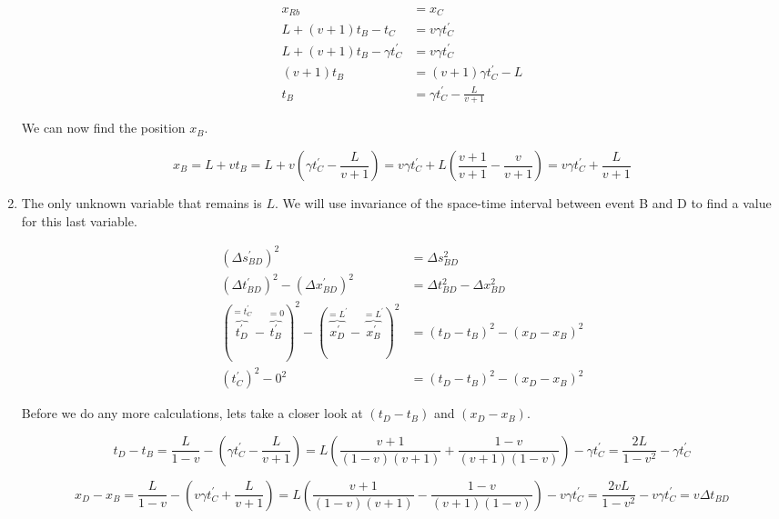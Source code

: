 \documentclass[a4paper,10pt,english]{article}
\begin{document}
\begin{enumerate}
\begin{align*}
x_{Rb}&=x_{C}\\
L+(v+1)t_{B}-t_{C}&=v\gamma t_{C}^{\prime}\\
L+(v+1)t_{B}-\gamma t_{C}^{\prime}&=v\gamma t_{C}^{\prime}\\
(v+1)t_{B}&=(v+1)\gamma t_{C}^{\prime}-L\\
t_{B}&=\gamma t_{C}^{\prime}-\frac{L}{v+1}
\end{align*}

We can now find the position $x_{B}$.

\begin{equation*}
x_{B}=L+vt_{B}=L+v\left(\gamma t_{C}^{\prime}-\frac{L}{v+1}\right)=v\gamma t_{C}^{\prime}+L\left(\frac{v+1}{v+1}-\frac{v}{v+1}\right)=v\gamma t_{C}^{\prime}+\frac{L}{v+1}
\end{equation*}

\item The only unknown variable that remains is $L$. We will use invariance of the space-time interval between event B and D to find a value for this last variable.

\begin{align}\label{eq:unfiniched_interval}
\left(\Delta s_{BD}^{\prime}\right)^{2}&=\Delta s_{BD}^{2} \nonumber\\
\left(\Delta t_{BD}^{\prime}\right)^{2}-\left(\Delta x_{BD}^{\prime}\right)^{2}&=\Delta t_{BD}^{2}-\Delta x_{BD}^{2} \nonumber\\
\left(\overbrace{t_{D}^{\prime}}^{=t_{C}^{\prime}}-\overbrace{t_{B}^{\prime}}^{=0}\right)^{2}-\left(\overbrace{x_{D}^{\prime}}^{=L^{\prime}}-\overbrace{x_{B}^{\prime}}^{=L^{\prime}}\right)^{2}&=\left(t_{D}-t_{B}\right)^{2}-\left(x_{D}-x_{B}\right)^{2} \nonumber\\
\left(t_{C}^{\prime}\right)^{2}-0^{2}&=\left(t_{D}-t_{B}\right)^{2}-\left(x_{D}-x_{B}\right)^{2}
\end{align}

Before we do any more calculations, lets take a closer look at $\left(t_{D}-t_{B}\right)$ and $\left(x_{D}-x_{B}\right)$.

\begin{equation*}
t_{D}-t_{B}=\frac{L}{1-v}-\left(\gamma t_{C}^{\prime}-\frac{L}{v+1}\right)=L\left(\frac{v+1}{(1-v)(v+1)}+\frac{1-v}{(v+1)(1-v)}\right)-\gamma t_{C}^{\prime}=\frac{2L}{1-v^{2}}-\gamma t_{C}^{\prime}
\end{equation*}

\begin{equation*}
x_{D}-x_{B}=\frac{L}{1-v}-\left(v\gamma t_{C}^{\prime}+\frac{L}{v+1}\right)=L\left(\frac{v+1}{(1-v)(v+1)}-\frac{1-v}{(v+1)(1-v)}\right)-v\gamma t_{C}^{\prime}=\frac{2vL}{1-v^{2}}-v\gamma t_{C}^{\prime}=v\Delta t_{BD}
\end{equation*}


\end{enumerate}
\end{document}
